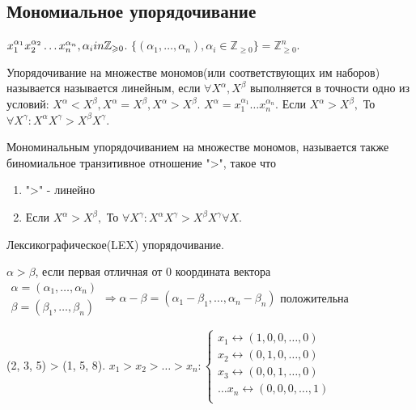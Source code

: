 \subsection{Мономиальное упорядочивание}
\(x_1^{\alpha_1}x_2^{\alpha_2}\ldots x_n^{\alpha_n}, \alpha_i\\in\mathbb{Z}_{\ge0}\). \newline
\(\{(\alpha_1,\ldots,\alpha_n), \alpha_i\in\mathbb{Z}_{\ge0}\} = \mathbb{Z}^n_{\ge0}\).
\begin{definition}
	Упорядочивание на множестве мономов(или соответствующих им наборов) называется называется линейным, если \(\forall X^\alpha, X^{\beta}\) выполняется в точности одно из условий: \(X^\alpha < X^\beta, X^\alpha = X^\beta, X^\alpha > X^\beta\). \(X^\alpha = x_1^{\alpha_1}\ldots x_n^{\alpha_n}\). Если \(X^\alpha > X^\beta,\) То \(\forall X^\gamma: X^\alpha X^\gamma > X^\beta X^\gamma \).
\end{definition}
\begin{definition}
	Мономинальным упорядочиванием на множестве мономов, называется также биномиальное  транзитивное отношение ">", такое что 
	\begin{enumerate}
		\item ">" - линейно 
		\item Если \(X^\alpha > X^\beta,\) То \(\forall X^\gamma: X^\alpha X^\gamma > X^\beta X^\gamma \forall X\).
	\end{enumerate}
\end{definition}
\begin{example}
	Лексикографическое(LEX) упорядочивание.
	\begin{definition}
		\(\alpha>\beta\), если первая отличная от 0 координата вектора \(\begin{gathered}
			\alpha = (\alpha_1,\ldots,\alpha_n) \\
			\beta = (\beta_1,\ldots, \beta_n)
		\end{gathered}\Longrightarrow \alpha-\beta = (\alpha_1-\beta_1,\ldots, \alpha_n - \beta_n)\) положительна
	\end{definition}
	(2, 3, 5) > (1, 5, 8).
	\(x_1>x_2>\ldots>x_n: \left\{\begin{gathered}
		x_1 \longleftrightarrow (1,0,0,\ldots,0) \\
		x_2 \longleftrightarrow (0,1,0,\ldots,0) \\
		x_3 \longleftrightarrow (0,0,1,\ldots,0) \\
		\ldots
		x_n \longleftrightarrow (0,0,0,\ldots,1) \\
	\end{gathered}\right.\)
\end{example}
